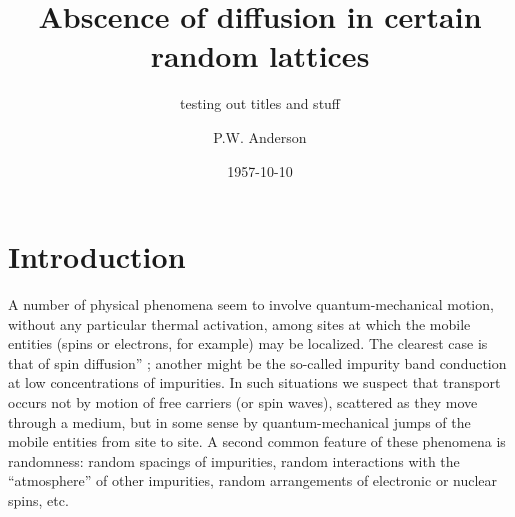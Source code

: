 \documentclass[%
	english,%
	 a4paper,%
	fleqn]{article}
\title{Abscence of diffusion in certain random lattices}
\subtitle{testing out titles and stuff}
\author{P.W. Anderson}
\date{1957-10-10}
\newcommand{\QuetzalAbstract}{{This paper presents a simple model
for such processes as spin diffusion or conduction in the ``impurity
band.'' These processes involve transport in a lattice which is in some
sense random, and in them diffusion is expected to take place via
quantum jumps between localized sites. In this simple model the
essential randomness is introduced by requiring the energy to vary
randomly from site to site. It is shown that at low enough densities no
diffusion at all can take place, and the criteria for transport to occur
are given.}}
\renewcommand\abstractname{\sffamily Abstract}
\begin{document}
    	\maketitle
        



% 


% 







 








\section{Introduction}\label{introduction}

A number of physical phenomena seem to involve quantum-mechanical
motion, without any particular thermal activation, among sites at which
the mobile entities (spins or electrons, for example) may be localized.
The clearest case is that of spin diffusion''
\autocite{bloembergen_1949,portis_1956}; another might be the so-called
impurity band conduction at low concentrations of impurities. In such
situations we suspect that transport occurs not by motion of free
carriers (or spin waves), scattered as they move through a medium, but
in some sense by quantum-mechanical jumps of the mobile entities from
site to site. A second common feature of these phenomena is randomness:
random spacings of impurities, random interactions with the
``atmosphere'' of other impurities, random arrangements of electronic or
nuclear spins, etc.
\end{document}
